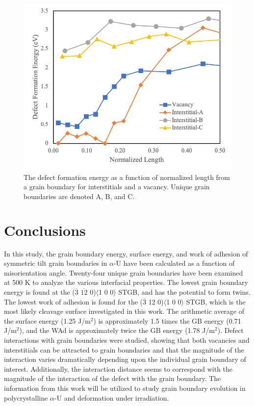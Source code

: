 \documentclass{anstrans}
\begin{document}
\begin{figure}[ht] %
  \centering
  \includegraphics[width=\columnwidth]{fig4.png}
  \caption{The defect formation energy as a function of normalized length from a grain boundary for interstitials and a vacancy. Unique grain boundaries are denoted A, B, and C.}
  \label{fig:4}
\end{figure}

\FloatBarrier

\section{Conclusions}

In this study, the grain boundary energy, surface energy, and work of adhesion of symmetric tilt grain boundaries in $\alpha$-U have been calculated as a function of misorientation angle. Twenty-four unique grain boundaries have been examined at 500 K to analyze the various interfacial properties. The lowest grain boundary energy is found at the ($\overline{3}$ $\overline{12}$ 0)$\langle$1 0 0$\rangle$ STGB, and has the potential to form twins. The lowest work of adhesion is found for the ($\overline{3}$ 12 0)$\langle$1 0 0$\rangle$ STGB, which is the most likely cleavage surface investigated in this work. The arithmetic average of the surface energy (1.25 J/m$^2$) is approximately 1.5 times the GB energy (0.71 J/m$^2$), and the WAd is approximately twice the GB energy (1.78 J/m$^2$). Defect interactions with grain boundaries were studied, showing that both vacancies and interstitials can be attracted to grain boundaries and that the magnitude of the interaction varies dramatically depending upon the individual grain boundary of interest. Additionally, the interaction distance seems to correspond with the magnitude of the interaction of the defect with the grain boundary. The information from this work will be utilized to study grain boundary evolution in polycrystalline $\alpha$-U and deformation under irradiation.
\end{document}
